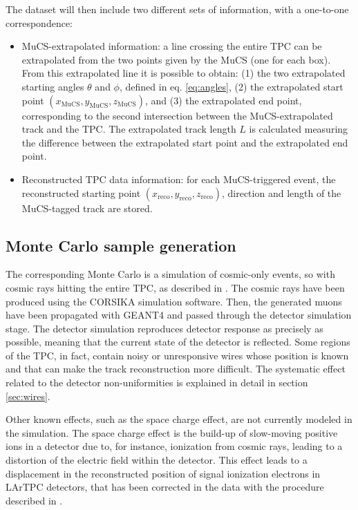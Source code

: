 \documentclass[a4paper,11pt]{article}
\begin{document}
The dataset will then include two different sets of information, with a one-to-one correspondence:
\begin{itemize}
  \item MuCS-extrapolated information: a line crossing the entire TPC can be extrapolated from the two points given by the MuCS (one for each box). From this extrapolated line it is possible to obtain: (1) the two extrapolated starting angles $\theta$ and $\phi$, defined in eq. \eqref{eq:angles}, (2) the extrapolated start point $(x_{\mathrm{MuCS}},y_{\mathrm{MuCS}},z_{\mathrm{MuCS}})$, and (3) the extrapolated end point, corresponding to the second intersection between the MuCS-extrapolated track and the TPC. The extrapolated track length $L$ is calculated measuring the difference between the extrapolated start point and the extrapolated end point.
  \item Reconstructed TPC data information: for each MuCS-triggered event, the reconstructed starting point $(x_{\mathrm{reco}},y_{\mathrm{reco}},z_{\mathrm{reco}})$, direction and length of the MuCS-tagged track are stored.
\end{itemize}

\subsection{Monte Carlo sample generation}\label{sec:mcgen}

The corresponding Monte Carlo is a simulation of cosmic-only events, so with cosmic rays hitting the entire TPC, as described in \cite{cosmic}. The cosmic rays have been produced using the CORSIKA \cite{corsika} simulation software. Then, the generated muons have been propagated with GEANT4 \cite{geant} and passed through the detector simulation stage. The detector simulation reproduces detector response as precisely as possible, meaning that the current state of the detector is reflected. Some regions of the TPC, in fact, contain noisy or unresponsive wires whose position is known and that can make the track reconstruction more difficult. The systematic effect related to the detector non-uniformities is explained in detail in section \ref{sec:wires}.

Other known effects, such as the space charge effect, are not currently modeled in the simulation. The space charge effect is the build-up of slow-moving positive ions in a detector due to, for instance, ionization from cosmic rays, leading to a distortion of the electric field within the detector. This effect leads to a displacement in the reconstructed position of signal ionization electrons in LArTPC detectors, that has been corrected in the data with the procedure described in \cite{sce}.
\end{document}
